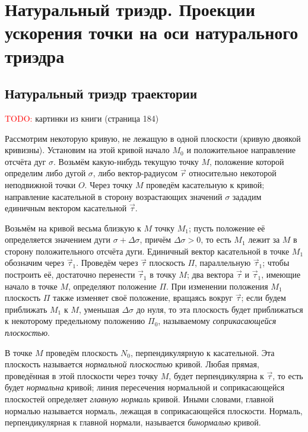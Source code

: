 \section{Натуральный триэдр. Проекции ускорения точки на оси натурального
триэдра}

\subsection{Натуральный триэдр траектории}

\textcolor{red}{TODO:} картинки из книги (страница 184)

Рассмотрим некоторую кривую, не лежащую в одной плоскости (кривую двоякой
кривизны). Установим на этой кривой начало $M_0$ и положительное направление
отсчёта дуг $\sigma$. Возьмём какую-нибудь текущую точку $M$, положение
которой определим либо дугой $\sigma$, либо вектор-радиусом $\vec{r}$
относительно некоторой неподвижной точки $O$. Через точку $M$ проведём
касательную к кривой; направление касательной в сторону возрастающих значений
$\sigma$ зададим единичным вектором касательной $\vec{\tau}$.

Возьмём на кривой весьма близкую к $M$ точку $M_1$; пусть положение её
определяется значением дуги $\sigma + \Delta \sigma$, причём
$\Delta \sigma > 0$, то есть $M_1$ лежит за $M$ в сторону положительного
отсчёта дуги. Единичный вектор касательной в точке $M_1$ обозначим через
$\vec{\tau}_1$. Проведём через $\vec{\tau}$ плоскость $\Pi$, параллельную
$\vec{\tau}_1$; чтобы построить её, достаточно перенести $\vec{\tau}_1$ в
точку $M$; два вектора $\vec{\tau}$ и $\vec{\tau}_1$, имеющие начало в точке
$M$, определяют положение $\Pi$. При изменении положения $M_1$ плоскость $\Pi$
также изменяет своё положение, вращаясь вокруг $\vec{\tau}$; если будем
приближать $M_1$ к $M$, уменьшая $\Delta \sigma$ до нуля, то эта плоскость
будет приближаться к некоторому предельному положению $\Pi_0$, называемому
\textit{соприкасающейся плоскостью}.

В точке $M$ проведём плоскость $N_0$, перпендикулярную к касательной. Эта
плоскость называется \textit{нормальной плоскостью} кривой. Любая прямая,
проведённая в этой плоскости через точку $M$, будет перпендикулярна к
$\vec{\tau}$, то есть будет \textit{нормальна} кривой; линия пересечения
нормальной и соприкасающейся плоскостей определяет \textit{главную нормаль}
кривой. Иными словами, главной нормалью называется нормаль, лежащая в
соприкасающейся плоскости. Нормаль, перпендикулярная к главной нормали,
называется \textit{бинормалью} кривой.

